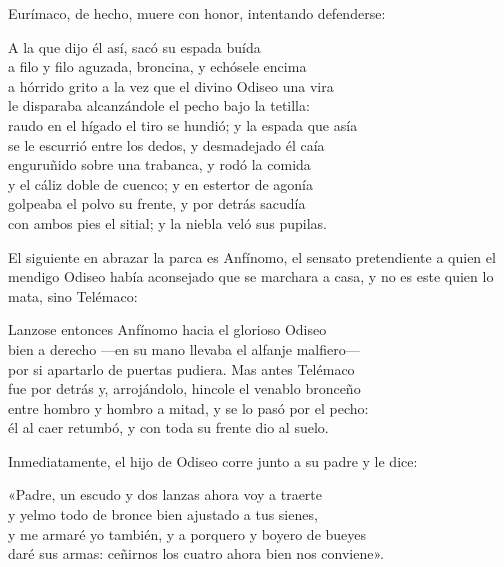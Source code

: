 Eurímaco, de hecho, muere con honor, intentando defenderse:

\begin{versocita}
A la que dijo él así, sacó su espada buída\\
a filo y filo aguzada, broncina, y echósele encima\\
a hórrido grito a la vez que el divino Odiseo una vira\\
le disparaba alcanzándole el pecho bajo la tetilla:\\
raudo en el hígado el tiro se hundió; y la espada que asía\\
se le escurrió entre los dedos, y desmadejado él caía\\
enguruñido sobre una trabanca, y rodó la comida\\
y el cáliz doble de cuenco; y en estertor de agonía\\
golpeaba el polvo su frente, y por detrás sacudía\\
con ambos pies el sitial; y la niebla veló sus pupilas.
\end{versocita}

El siguiente en abrazar la parca es Anfínomo, el sensato pretendiente a quien el mendigo Odiseo había aconsejado que se marchara a casa, y no es este quien lo mata, sino Telémaco:

\begin{versocita}
Lanzose entonces Anfínomo hacia el glorioso Odiseo\\
bien a derecho ---en su mano llevaba el alfanje malfiero---\\
por si apartarlo de puertas pudiera. Mas antes Telémaco\\
fue por detrás y, arrojándolo, hincole el venablo bronceño\\
entre hombro y hombro a mitad, y se lo pasó por el pecho:\\
él al caer retumbó, y con toda su frente dio al suelo.
\end{versocita}

Inmediatamente, el hijo de Odiseo corre junto a su padre y le dice:

\begin{versocita}
«Padre, un escudo y dos lanzas ahora voy a traerte\\
y yelmo todo de bronce bien ajustado a tus sienes,\\
y me armaré yo también, y a porquero y boyero de bueyes\\
daré sus armas: ceñirnos los cuatro ahora bien nos conviene».
\end{versocita}


